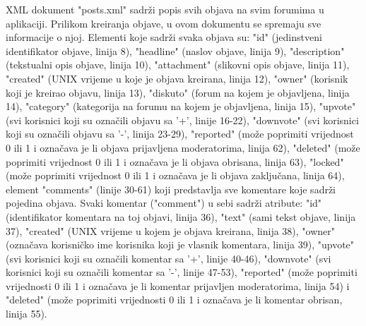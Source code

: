 \documentclass{foi}
\begin{document}
XML dokument "posts.xml" sadrži popis svih objava na svim forumima u aplikaciji. Prilikom kreiranja objave, u ovom dokumentu se spremaju sve informacije o njoj.  Elementi koje sadrži svaka objava su: "id" (jedinstveni identifikator objave, linija 8), "headline" (naslov objave, linija 9), "description" (tekstualni opis objave, linija 10), "attachment" (slikovni opis objave, linija 11), "created" (UNIX vrijeme u koje je objava kreirana, linija 12), "owner" (korisnik koji je kreirao objavu, linija 13), "diskuto" (forum na kojem je objavljena, linija 14), "category" (kategorija na forumu na kojem je objavljena, linija 15), "upvote" (svi korisnici koji su označili objavu sa '+', linije 16-22), "downvote" (svi korisnici koji su označili objavu sa '-', linija 23-29), "reported" (može poprimiti vrijednost 0 ili 1 i označava je li objava prijavljena moderatorima, linija 62), "deleted" (može poprimiti vrijednost 0 ili 1 i označava je li objava obrisana, linija 63), "locked" (može poprimiti vrijednost 0 ili 1 i označava je li objava zaključana, linija 64), element "comments" (linije 30-61) koji predstavlja sve komentare koje sadrži pojedina objava. Svaki komentar ("comment") u sebi sadrži atribute: "id" (identifikator komentara na toj objavi, linija 36), "text" (sami tekst objave, linija 37), "created" (UNIX vrijeme u kojem je objava kreirana, linija 38), "owner" (označava korisničko ime korisnika koji je vlasnik komentara, linija 39), "upvote" (svi korisnici koji su označili komentar sa '+', linije 40-46), "downvote" (svi korisnici koji su označili komentar sa '-', linije 47-53), "reported" (može poprimiti vrijednosti 0 ili 1 i označava je li komentar prijavljen moderatorima, linija 54) i "deleted" (može poprimiti vrijednosti 0 ili 1 i označava je li komentar obrisan, linija 55).
\end{document}
